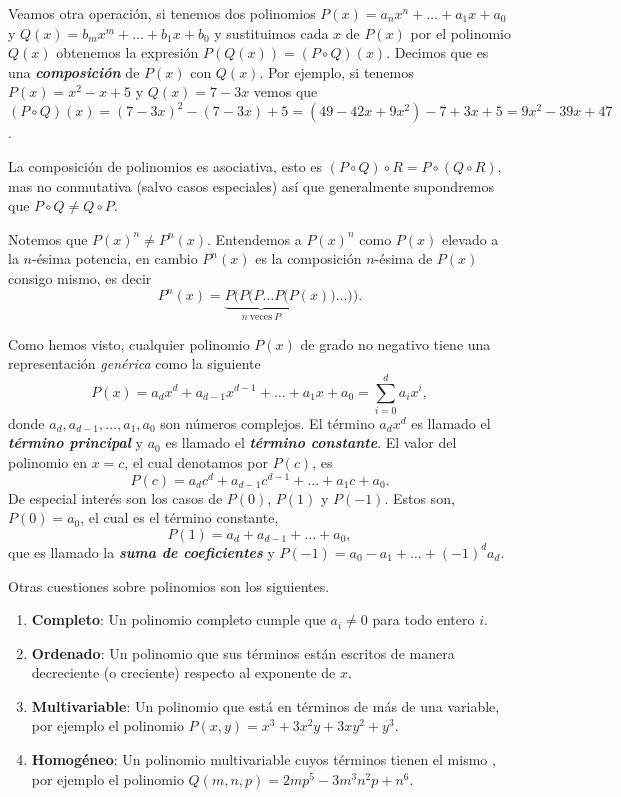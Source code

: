 Veamos otra operación, si tenemos dos polinomios $P(x) = a_n x^n + \ldots + a_1 x + a_0$ y $Q(x) = b_m x^m + \ldots + b_1 x + b_0$ y sustituimos cada $x$ de $P(x)$ por el polinomio $Q(x)$ obtenemos la expresión $P\left(Q(x)\right) = (P \circ Q)(x)$.
Decimos que es una \textbf{\emph{composición}} de $P(x)$ con $Q(x)$.
Por ejemplo, si tenemos $P(x) = x^2 - x + 5$ y $Q(x) = 7 - 3x$ vemos que $(P \circ Q)(x) = (7 - 3x)^2 - (7 - 3x) + 5 = (49 - 42x + 9x^2) - 7 + 3x + 5 = 9x^2 - 39x + 47$.

La composición de polinomios es asociativa, esto es $(P \circ Q) \circ R = P \circ (Q \circ R)$, mas no conmutativa (salvo casos especiales) así que generalmente supondremos que $P \circ Q \neq  Q \circ P$.
\\
\begin{remark.tcb}
    Notemos que $P(x)^n \neq P^n(x)$.
    Entendemos a $P(x)^n$ como $P(x)$ elevado a la $n$-ésima potencia, en cambio $P^n(x)$ es la composición $n$-ésima de $P(x)$ consigo mismo, es decir
    \[
        P^n(x) = \underbrace{P(P(P\dots P(P}_{n\ \text{veces}\ P} (x))\dots)).
    \]
\end{remark.tcb}

Como hemos visto, cualquier polinomio $P(x)$ de grado no negativo tiene una representación \textit{genérica} como la siguiente
\[
    P(x) = a_d x^d + a_{d - 1} x^{d - 1} + \ldots + a_1 x + a_0 = \sum_{i = 0}^{d} a_i x^i,
\]
donde $a_d, a_{d - 1}, \ldots, a_1, a_0$ son números complejos.
El término $a_d x^d$ es llamado el \textbf{\emph{término principal}} y $a_0$ es llamado el \textbf{\emph{término constante}}.
El valor del polinomio en $x = c$, el cual denotamos por $P(c)$, es
\[
    P(c) = a_d c^d + a_{d - 1}c^{d - 1} + \ldots + a_1 c + a_0.
\]
De especial interés son los casos de $P(0)$, $P(1)$ y $P(-1)$.
Estos son, $P(0) = a_0$, el cual es el término constante,
\[
    P(1) = a_d + a_{d - 1} + \ldots + a_0,
\]
que es llamado la \textbf{\emph{suma de coeficientes}} y $P(-1) = a_0 - a_1 + \ldots + (-1)^d a_d.$

Otras cuestiones sobre polinomios son los siguientes.
\begin{enumerate}
    \item \textbf{Completo}: Un polinomio completo cumple que $a_i \neq 0$ para todo entero $i$.
    \item \textbf{Ordenado}: Un polinomio que sus términos están escritos de manera decreciente (o creciente) respecto al exponente de $x$.
    \item \textbf{Multivariable}: Un polinomio que está en términos de más de una variable, por ejemplo el polinomio $P(x, y) = x^3 + 3x^2 y + 3xy^2 + y^3$.
    \item \textbf{Homogéneo}: Un polinomio multivariable cuyos términos tienen el mismo , por ejemplo el polinomio $Q(m, n, p) = 2m p^5 - 3m^3 n^2 p + n^6$.
\end{enumerate}

